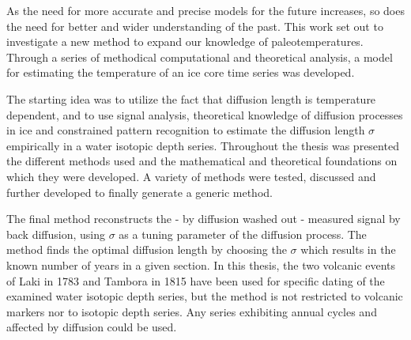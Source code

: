 \documentclass[../../CompleteThesis2/Complete_2ndDraft]{subfiles}
\begin{document}
	
As the need for more accurate and precise models for the future increases, so does the need for better and wider understanding of the past. This work set out to investigate a new method to expand our knowledge of paleotemperatures. Through a series of methodical computational and theoretical analysis, a model for estimating the temperature of an ice core time series was developed. 

The starting idea was to utilize the fact that diffusion length is temperature dependent, and to use signal analysis, theoretical knowledge of diffusion processes in ice and constrained pattern recognition to estimate the diffusion length $\sigma$ empirically in a water isotopic depth series. Throughout the thesis was presented the different methods used and the mathematical and theoretical foundations on which they were developed. A variety of methods were tested, discussed and further developed to finally generate a generic method.

The final method reconstructs the - by diffusion washed out - measured signal by back diffusion, using $\sigma$ as a tuning parameter of the diffusion process. The method finds the optimal diffusion length by choosing the $\sigma$ which results in the known number of years in a given section. In this thesis, the two volcanic events of Laki in 1783 and Tambora in 1815 have been used for specific dating of the examined water isotopic depth series, but the method is not restricted to volcanic markers nor to isotopic depth series. Any series exhibiting annual cycles and affected by diffusion could be used.
\end{document}
